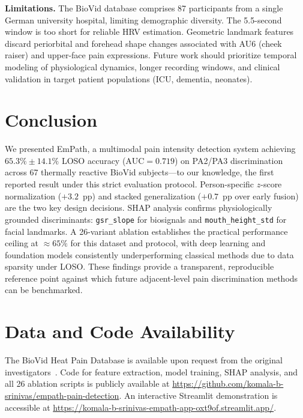 \documentclass[sigconf]{acmart}
\begin{document}
\textbf{Limitations.}
The BioVid database comprises 87 participants from a single German university
hospital, limiting demographic diversity. The 5.5-second window is too short
for reliable HRV estimation. Geometric landmark features discard periorbital
and forehead shape changes associated with AU6 (cheek raiser) and upper-face
pain expressions. Future work should prioritize temporal modeling of
physiological dynamics, longer recording windows, and clinical validation in
target patient populations (ICU, dementia, neonates).

\section{Conclusion}
\label{sec:conclusion}

We presented EmPath, a multimodal pain intensity detection system achieving
$65.3\% \pm 14.1\%$ LOSO accuracy ($\text{AUC} = 0.719$) on PA2/PA3
discrimination across 67 thermally reactive BioVid subjects---to our knowledge,
the first reported result under this strict evaluation protocol. Person-specific
$z$-score normalization ($+3.2$~pp) and stacked generalization
($+0.7$~pp over early fusion) are the two key design decisions. SHAP analysis
confirms physiologically grounded discriminants: \texttt{gsr\_slope} for
biosignals and \texttt{mouth\_height\_std} for facial landmarks. A 26-variant
ablation establishes the practical performance ceiling at $\approx 65\%$ for
this dataset and protocol, with deep learning and foundation models
consistently underperforming classical methods due to data sparsity under LOSO.
These findings provide a transparent, reproducible reference point against
which future adjacent-level pain discrimination methods can be benchmarked.

\section*{Data and Code Availability}

The BioVid Heat Pain Database is available upon request from the original
investigators~\cite{walter2013}. Code for feature extraction, model training,
SHAP analysis, and all 26 ablation scripts is publicly available at
\url{https://github.com/komala-b-srinivas/empath-pain-detection}.
An interactive Streamlit demonstration is accessible at
\url{https://komala-b-srinivas-empath-app-oxt9of.streamlit.app/}.
\end{document}
